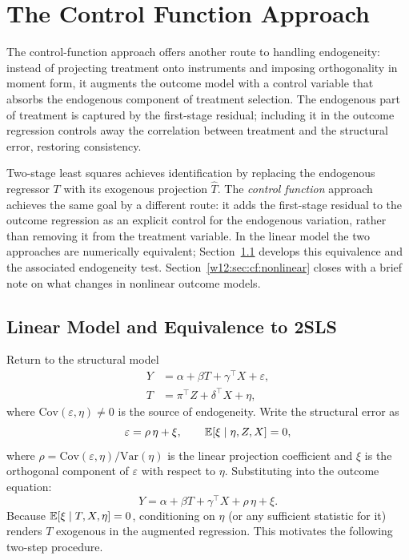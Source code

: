 \documentclass[master.tex]{subfiles}
\begin{document}
\section{The Control Function Approach}
\label{w12:sec:cf}

The control-function approach offers another route to handling
endogeneity: instead of projecting treatment onto instruments and
imposing orthogonality in moment form, it augments the outcome model
with a control variable that absorbs the endogenous component of
treatment selection.  The endogenous part of treatment is captured
by the first-stage residual; including it in the outcome regression
controls away the correlation between treatment and the structural
error, restoring consistency.

Two-stage least squares achieves identification by replacing the endogenous
regressor $T$ with its exogenous projection $\hat{T}$.  The \emph{control
function} approach achieves the same goal by a different route: it adds the
first-stage residual to the outcome regression as an explicit control for
the endogenous variation, rather than removing it from the treatment variable.
In the linear model the two approaches are numerically equivalent;
Section~\ref{w12:sec:cf:linear} develops this equivalence and the associated
endogeneity test.  Section~\ref{w12:sec:cf:nonlinear} closes with a brief
note on what changes in nonlinear outcome models.

\subsection{Linear Model and Equivalence to 2SLS}
\label{w12:sec:cf:linear}

Return to the structural model
\begin{align*}
  Y &= \alpha + \beta T + \gamma^\top X + \varepsilon, \\
  T &= \pi^\top Z + \delta^\top X + \eta,
\end{align*}
where $\mathrm{Cov}(\varepsilon, \eta) \neq 0$ is the source of
endogeneity.  Write the structural error as
\[
  \varepsilon = \rho\,\eta + \xi,
  \qquad
  \mathbb{E}[\xi \mid \eta, Z, X] = 0,
\]
where $\rho = \mathrm{Cov}(\varepsilon, \eta)/\mathrm{Var}(\eta)$ is the
linear projection coefficient and $\xi$ is the orthogonal component of
$\varepsilon$ with respect to $\eta$.  Substituting into the outcome
equation:
\[
  Y = \alpha + \beta T + \gamma^\top X + \rho\,\eta + \xi.
\]
Because $\mathbb{E}[\xi \mid T, X, \eta] = 0$, conditioning on $\eta$ (or any
sufficient statistic for it) renders $T$ exogenous in the augmented
regression.  This motivates the following two-step procedure.
\end{document}
